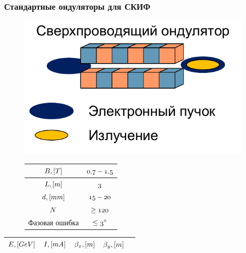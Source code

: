 \documentclass[14pt, hyperref = {colorlinks}]{beamer}
\begin{document}
\iffalse
\small
\begin{frame}
\frametitle{Стандартные ондуляторы для СКИФ}\label{t1}
\vspace{-10pt}
\begin{figure}[h]
	\begin{minipage}[h]{0.49\linewidth}
		\raggedright{\includegraphics[width=0.99\linewidth]{pic/sim_und.pdf}}
	\end{minipage}
	\begin{minipage}[h]{0.49\linewidth}
	\vspace{10pt}
	\begin{table}[h]
		\tiny
		\begin{tabular}{c|c}
			\hline\hline
			\rule{0pt}{3ex}$\mathnormal{B, [T]}$      & $\mathnormal{0.7 - 1.5}$   \\ \hline
			\rule{0pt}{3ex}$\mathnormal{L, [m]}$ 	  &  $\mathnormal{3}$        \\ \hline
			\rule{0pt}{3ex}$\mathnormal{d, [mm]}$     & $\mathnormal{15 - 20}$     \\ \hline
			\rule{0pt}{3ex}$\mathnormal{N}$           & $\mathnormal{\geq 120}$ \\ \hline
			\rule{0pt}{3ex}Фазовая ошибка &$\mathnormal{\leq 3^{\circ}}$  \\
			\hline\hline
		\end{tabular}
	\end{table}
	\end{minipage}
\end{figure}
\vspace{-20pt}
\begin{table}[h]
	\tiny
	\begin{tabular}{c|c|c|c|c}
		\hline
		\hline
		\rule{0pt}{3ex}   $\mathnormal{E, [GeV]}$ & $\mathnormal{I, [mA]}$ & $\mathnormal{\beta_x, [m]}$ & $\mathnormal{\beta_{y}, [m]}$&\\ \hline

\end{tabular}
\end{table}
\end{frame}
\end{document}

